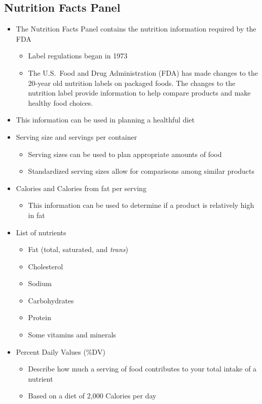 \documentclass[title={Chapter 2}]{fdsn201notes}
\begin{document}
\subsection{Nutrition Facts Panel}\label{subsec:nutrition-facts-panel}
\begin{itemize}
	\item The Nutrition Facts Panel contains the nutrition information required by the FDA
	\begin{itemize}
		\item Label regulations began in 1973
		\item The U.S.\ Food and Drug Administration (FDA) has made changes to the 20-year old nutrition labels on packaged foods.
		The changes to the nutrition label provide information to help compare products and make healthy food choices.
	\end{itemize}
	\item This information can be used in planning a healthful diet
	\item Serving size and servings per container
	\begin{itemize}
		\item Serving sizes can be used to plan appropriate amounts of food
		\item Standardized serving sizes allow for comparisons among similar products
	\end{itemize}
	\item Calories and Calories from fat per serving
	\begin{itemize}
		\item This information can be used to determine if a product is relatively high in fat
	\end{itemize}
	\item List of nutrients
	\begin{itemize}
		\item Fat (total, saturated, and \emph{trans})
		\item Cholesterol
		\item Sodium
		\item Carbohydrates
		\item Protein
		\item Some vitamins and minerals
	\end{itemize}
	\item Percent Daily Values (\%DV)
	\begin{itemize}
		\item Describe how much a serving of food contributes to your total intake of a nutrient
		\item Based on a diet of 2,000 Calories per day

\end{itemize}
\end{itemize}
\end{document}
